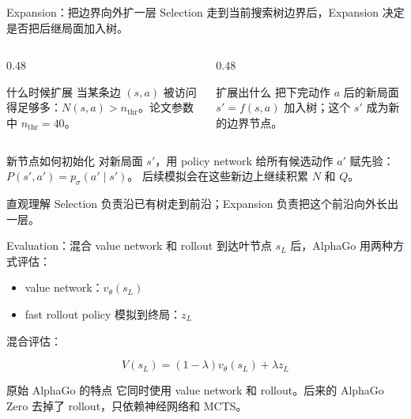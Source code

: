 \documentclass[UTF8,aspectratio=169,10pt]{ctexbeamer}
\begin{document}
\begin{frame}{Expansion：把边界向外扩一层}
  \footnotesize
  \setlength{\abovedisplayskip}{0.25em}
  \setlength{\belowdisplayskip}{0.25em}
  Selection 走到当前搜索树边界后，Expansion 决定是否把后继局面加入树。

  \vspace{0.05cm}
  \begin{columns}[T,onlytextwidth]
    \begin{column}{0.48\textwidth}
      \begin{block}{什么时候扩展}
        当某条边 $(s,a)$ 被访问得足够多：\(N(s,a) > n_{\mathrm{thr}}\)。论文参数中 \(n_{\mathrm{thr}}=40\)。
      \end{block}
    \end{column}
    \begin{column}{0.48\textwidth}
      \begin{block}{扩展出什么}
        把下完动作 $a$ 后的新局面 \(s'=f(s,a)\) 加入树；这个 \(s'\) 成为新的边界节点。
      \end{block}
    \end{column}
  \end{columns}

  \begin{block}{新节点如何初始化}
    对新局面 \(s'\)，用 policy network 给所有候选动作 \(a'\) 赋先验：\(P(s',a') = p_{\sigma}(a'\mid s')\)。
    后续模拟会在这些新边上继续积累 $N$ 和 $Q$。
  \end{block}

  \begin{alertblock}{直观理解}
    Selection 负责沿已有树走到前沿；Expansion 负责把这个前沿向外长出一层。
  \end{alertblock}
\end{frame}

\begin{frame}{Evaluation：混合 value network 和 rollout}
  到达叶节点 $s_L$ 后，AlphaGo 用两种方式评估：

  \begin{itemize}
    \item value network：$v_{\theta}(s_L)$
    \item fast rollout policy 模拟到终局：$z_L$
  \end{itemize}

  混合评估：

  \[
    V(s_L) = (1-\lambda)v_{\theta}(s_L) + \lambda z_L
  \]

  \begin{block}{原始 AlphaGo 的特点}
    它同时使用 value network 和 rollout。后来的 AlphaGo Zero 去掉了 rollout，只依赖神经网络和 MCTS。
  \end{block}
\end{frame}
\end{document}
